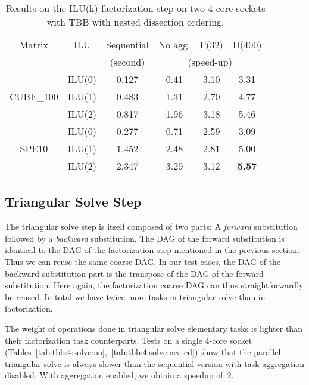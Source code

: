 \begin{table}[!h]
  \renewcommand{\arraystretch}{1.3}
  \caption{Results on the ILU(k) factorization step on two 4-core
    sockets with TBB with nested dissection ordering.}
  \label{tab:tbb:8:facto:nested}
  \centering
  \begin{tabular}{|c|c||c|c|c|c|}
    \hline
    Matrix & ILU & Sequential & No agg. & F(32) & D(400)\\
    &     &  (second)  & \multicolumn{3}{c|}{(speed-up)}\\
    \hline
    \hline
    & ILU(0) & 0.127 & 0.41 & 3.10 & 3.31\\
    CUBE\_100 & ILU(1) & 0.483 & 1.31 & 2.70 & 4.77\\
    & ILU(2) & 0.817 & 1.96 & 3.18 & 5.46\\
    \hline
    & ILU(0) & 0.277 & 0.71 & 2.59 & 3.09\\
    SPE10     & ILU(1) & 1.452 & 2.48 & 2.81 & 5.00\\
    & ILU(2) & 2.347 & 3.29 & 3.12 & {\bf 5.57}\\
    \hline
  \end{tabular}
\end{table}

\subsection{Triangular Solve Step}\label{subsec:solve}

The triangular solve step is itself composed of two parts: A
{\em forward} substitution followed by a {\em backward}
substitution. The DAG of the forward substitution is identical to
the DAG of the factorization step mentioned in the previous section.
Thus we can reuse the same coarse
DAG. In our test cases, the DAG of the backward substitution part is
the transpose of the DAG of the forward substitution. Here again,
the factorization coarse DAG can thus straightforwardly be reused.
In total we have twice more tasks in triangular solve than in factorization.

The weight of operations done in triangular solve elementary tasks
is lighter than their factorization task counterparts.
Tests on a
single 4-core socket (Tables~\ref{tab:tbb:4:solve:no},~\ref{tab:tbb:4:solve:nested})
show that the parallel triangular solve is always slower than
the sequential version with task aggregation disabled. With
aggregation enabled, we obtain a speedup of~2.

